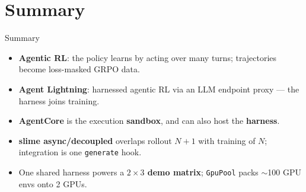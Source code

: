 \documentclass[aspectratio=169]{beamer}
\begin{document}
\section*{Summary}


\begin{frame}{Summary}
  \begin{itemize}\setlength\itemsep{0.3em}
    \item \textbf{Agentic RL}: the policy learns by acting over many turns; trajectories become
      loss-masked GRPO data.
    \item \textbf{Agent Lightning}: harnessed agentic RL via an LLM endpoint proxy --- the harness
      joins training.
    \item \textbf{AgentCore} is the execution \textbf{sandbox}, and can also host the \textbf{harness}.
    \item \textbf{slime async/decoupled} overlaps rollout $N{+}1$ with training of $N$; integration
      is one \texttt{generate} hook.
    \item One shared harness powers a \textbf{$2\times3$ demo matrix}; \texttt{GpuPool} packs $\sim$100
      GPU envs onto 2 GPUs.
  \end{itemize}
\end{frame}


\end{document}
